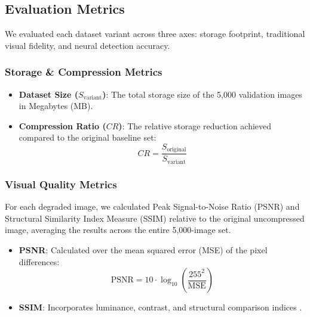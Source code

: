 \documentclass[12pt, a4paper]{article}
\begin{document}
\subsection{Evaluation Metrics}
We evaluated each dataset variant across three axes: storage footprint, traditional visual fidelity, and neural detection accuracy.

\subsubsection{Storage \& Compression Metrics}
\begin{itemize}
    \item \textbf{Dataset Size ($S_{\text{variant}}$)}: The total storage size of the 5,000 validation images in Megabytes (MB).
    \item \textbf{Compression Ratio ($CR$)}: The relative storage reduction achieved compared to the original baseline set:
    \begin{equation}
    CR = \frac{S_{\text{original}}}{S_{\text{variant}}}
    \label{eq:cr}
    \end{equation}
\end{itemize}

\subsubsection{Visual Quality Metrics}
For each degraded image, we calculated Peak Signal-to-Noise Ratio (PSNR) and Structural Similarity Index Measure (SSIM) relative to the original uncompressed image, averaging the results across the entire 5,000-image set.
\begin{itemize}
    \item \textbf{PSNR}: Calculated over the mean squared error (MSE) of the pixel differences:
    \begin{equation}
    \text{PSNR} = 10 \cdot \log_{10}\left(\frac{255^2}{\text{MSE}}\right)
    \label{eq:psnr}
    \end{equation}
    \item \textbf{SSIM}: Incorporates luminance, contrast, and structural comparison indices \cite{wang2004}.
\end{itemize}
\end{document}
